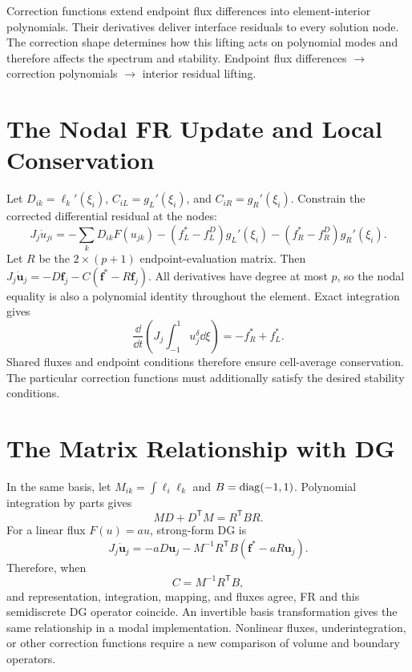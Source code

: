 {Correction functions extend endpoint flux differences into element-interior polynomials. Their derivatives deliver interface residuals to every solution node. The correction shape determines how this lifting acts on polynomial modes and therefore affects the spectrum and stability.}
{Endpoint flux differences $\longrightarrow$ correction polynomials $\longrightarrow$ interior residual lifting.}

\section{The Nodal FR Update and Local Conservation}
Let $D_{ik}=\ell_k'(\xi_i)$, $C_{iL}=g_L'(\xi_i)$, and $C_{iR}=g_R'(\xi_i)$.
Constrain the corrected differential residual at the nodes:
\begin{equation}\label{eq:fr-operator}
J_j\dot u_{ji}
=-\sum_kD_{ik}F(u_{jk})
-(f_L^*-f_L^D)g_L'(\xi_i)
-(f_R^*-f_R^D)g_R'(\xi_i).
\end{equation}
Let $R$ be the $2\times(p+1)$ endpoint-evaluation matrix. Then
$J_j\dot{\bm u}_j=-D\bm f_j-C(\bm f^*-R\bm f_j)$.
All derivatives have degree at most $p$, so the nodal equality is also a polynomial identity throughout the element.
Exact integration gives
\[
\frac{\dd}{\dd t}\left(J_j\int_{-1}^1u_j^\delta\dd\xi\right)
=-f_R^*+f_L^*.
\]
Shared fluxes and endpoint conditions therefore ensure cell-average conservation. The particular correction functions must additionally satisfy the desired stability conditions.

\section{The Matrix Relationship with DG}
In the same basis, let $M_{ik}=\int\ell_i\ell_k$ and $B=\operatorname{diag}(-1,1)$.
Polynomial integration by parts gives
\[
MD+D^{\mathsf T}M=R^{\mathsf T}BR.
\]
For a linear flux $F(u)=au$, strong-form DG is
\[
J_j\dot{\bm u}_j=-aD\bm u_j-M^{-1}R^{\mathsf T}B
(\bm f^*-aR\bm u_j).
\]
Therefore, when
\begin{equation}\label{eq:fr-dg-lift}
C=M^{-1}R^{\mathsf T}B,
\end{equation}
and representation, integration, mapping, and fluxes agree, FR and this semidiscrete DG operator coincide.
An invertible basis transformation gives the same relationship in a modal implementation.
Nonlinear fluxes, underintegration, or other correction functions require a new comparison of volume and boundary operators.

